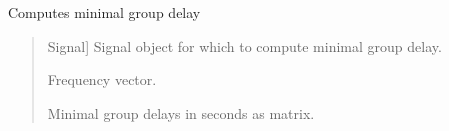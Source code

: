 \documentclass[letterpaper,10pt,english]{sphinxmanual}
\begin{document}
\begin{fulllineitems}
\label{\detokenize{modules/dsptoolbox.standard_functions:dsptoolbox.standard_functions.minimal_group_delay}}
\pysigstartsignatures
{}
\pysigstopsignatures
\sphinxAtStartPar
Computes minimal group delay
\begin{quote}\begin{description}
\begin{description}
\sphinxlineitem{\sphinxstylestrong{signal}}{[}Signal{]}
\sphinxAtStartPar
Signal object for which to compute minimal group delay.

\end{description}

\begin{description}
\sphinxlineitem{\sphinxstylestrong{f}}{[}\sphinxtitleref{np.ndarray}{]}
\sphinxAtStartPar
Frequency vector.

\sphinxlineitem{\sphinxstylestrong{min\_gd}}{[}\sphinxtitleref{np.ndarray}{]}
\sphinxAtStartPar
Minimal group delays in seconds as matrix.

\end{description}

\end{description}\end{quote}

\end{fulllineitems}

\end{document}
